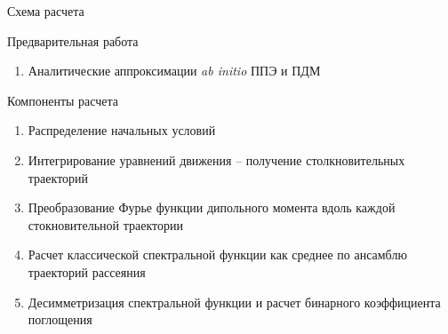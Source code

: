 \documentclass[10pt,pdf,hyperref={unicode},xcolor=dvipsnames]{beamer}
\begin{document}
\begin{frame}{Схема расчета}
    \begin{block}{Предварительная работа}
        \begin{enumerate}
            \item Аналитические аппроксимации \textit{ab initio} ППЭ и ПДМ 
        \end{enumerate}
    \end{block}
    \begin{block}{Компоненты расчета}
        \begin{enumerate}
        \item Распределение начальных условий
        \item Интегрирование уравнений движения -- получение столкновительных траекторий
        \item Преобразование Фурье функции дипольного момента вдоль каждой стокновительной траектории
        \item Расчет классической спектральной функции как среднее по ансамблю траекторий рассеяния 
        \item Десимметризация спектральной функции и расчет бинарного коэффициента поглощения
        \end{enumerate}
    \end{block}
\end{frame}
\end{document}
